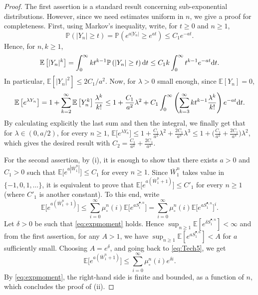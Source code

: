 \documentclass[AHL,XML,longabstracts,Unicode]{cedram}
\renewcommand{\P}{\mathbb{P}}
\newcommand{\E}{\mathbb{E}}
\def\d{{\rm d}}
\def\mucn{\mu_{\circ}^{n}}
\def\Sbn{S^{\bullet,n}}
\newcommand\Es[1]{\mathbb{E}\left[#1\right]}
\renewcommand\Pr[1]{\mathbb{P}\left(#1\right)}
\begin{document}
 \begin{proof}
 The first assertion is a standard result concerning sub-exponential distributions. However, since we need estimates uniform in $n$, we give a proof for completeness. First,  using Markov's inequality, write, for $t \geq 0$ and $n \geq 1$,
 \[\P(|Y_{n}| \geq t)= \P(e^{a|Y_{n}|} \geq e^{at}) \leq C_{1} e^{-at}.\]
 Hence, for $n,k \geq 1$,
 \[\Es{|Y_{n}|^{k}}=\int_{0}^{\infty} k t^{k-1} \Pr{|Y_{n}| \geq t} {\d}t \leq  C_{1} k \int_{0}^{\infty} t^{k-1} e^{-a t} {\d}t.\]
 In particular, $\Es{|Y_{n}|^{2}} \leq 2C_{1}/a^{2}$.
 Now, for $\lambda>0$ small enough, since $\E[Y_{n}]=0$,
 \[ \Es{e^{\lambda Y_{n}}}=1+ \sum_{k=2}^{\infty} \Es{Y_{n}^{k}} \frac{\lambda^{k}}{k!}  \leq 1+ \frac{C_{1}}{a^{2}} \lambda^{2}+  C_{1}  \int_{0}^{\infty}  \left( \sum_{k=3}^{\infty}  kt^{k-1} \frac{\lambda^{k}}{k!} \right) e^{-a t} {\d}t.\]
 By calculating explicitly the last sum and then the integral, we finally get that for $\lambda \in (0,a/2)$, for every $n \geq 1$, $\E\big[e^{\lambda Y_{n}} \big] \leq  1+ \tfrac{C_{1}}{a^{2}} \lambda^{2}+  \tfrac{2C_{1}}{a^{3}} \lambda^{3} \leq 1+ \big( \tfrac{C_{1}}{a^{2}}+ \tfrac{2C_{1}}{a^{3}} \big) \lambda^{2}$, which gives the desired result with $C_{2}= \tfrac{C_{1}}{a^{2}}+ \tfrac{2C_{1}}{a^{3}}$.
 \medskip

 For the second assertion, by (i), it is enough to show that there exists $a>0$ and $C_{1}>0$ such that $\E\big[e^{a |\overline{W}^{n}_{1}|}\big] \leq C_{1}$ for every $n \geq 1$.
 Since $\overline{W}^{n}_{1}$ takes value in $\{-1,0,1,\dots\}$, it is equivalent to prove
 that
 $\E\big[e^{a (\overline{W}^{n}_{1}+1)}\big] \leq C'_{1}$ for every $n \geq 1$
 (where $C'_1$ is another constant).
 To this end, write
 \begin{equation}
   \E\big[e^{a (\overline{W}^{n}_{1}+1)}\big]  \leq  \sum_{ i=0}^{\infty}\mucn(i)  \E \big[ e^{a \Sbn_{i}} \big] =   \sum_{ i=0}^{\infty}\mucn(i)  \E \big[e^{a \Sbn_{1}} \big]^{i}.
   \label{eq:Tech5}
 \end{equation}
 Let $\delta>0$ be such that  \eqref{eq:expmoment}  holds.
 Hence $\sup_{n \ge 1} \E[e^{\delta \Sbn_{1}}]<\infty$
 and from the first assertion,
 for any $A>1$, we have $\sup_{n \ge 1} \E[e^{a \Sbn_{1}}] <A$ for $a$ sufficiently small.
 Choosing $A=e^\delta$, and going back to \eqref{eq:Tech5}, we get
 \[\E\big[e^{a (\overline{W}^{n}_{1}+1)}\big]  \leq \sum_{ i=0}^{\infty}\mucn(i) e^{\delta i}.\]
 By \eqref{eq:expmoment}, the right-hand side is finite and bounded, as a function of $n$,
 which concludes the proof of (ii).
 \medskip


\end{proof}
\end{document}
